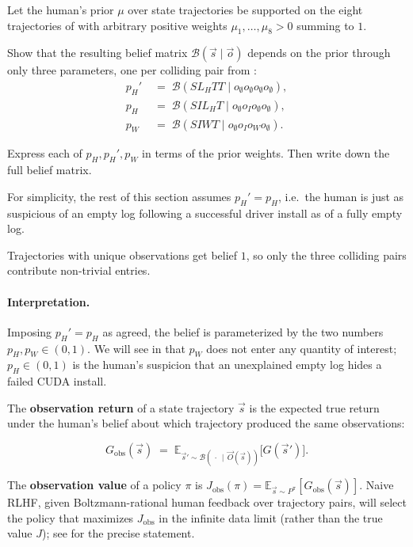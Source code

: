 \documentclass[11pt]{article}
\newcommand{\cB}{\mathcal{B}}
\newcommand{\E}{\mathbb{E}}
\newcommand{\Gobs}{G_{\mathrm{obs}}}
\newcommand{\Jobs}{J_{\mathrm{obs}}}
\begin{document}

\begin{exercise}
\label{prob:belief}
Let the human's prior $\mu$ over
state trajectories be supported on the eight trajectories of
 with arbitrary positive weights
$\mu_1, \dots, \mu_8 > 0$ summing to $1$.

Show that the resulting belief matrix
$\cB(\vec s \mid \vec o)$ depends on the prior through only three
parameters, one per colliding pair from :
\begin{align*}
p_H' &\;=\; \cB(SL_HTT \mid o_\emptyset o_\emptyset o_\emptyset o_\emptyset), \\
p_H  &\;=\; \cB(SIL_HT \mid o_\emptyset o_I o_\emptyset o_\emptyset), \\
p_W  &\;=\; \cB(SIWT \mid o_\emptyset o_I o_W o_\emptyset).
\end{align*}

Express each of $p_H, p_H', p_W$ in terms of the prior weights. Then
write down the full belief matrix.

For simplicity, the rest of this section assumes $p_H' = p_H$, i.e.\ the
human is just as suspicious of an empty log following a successful driver
install as of a fully empty log.
\end{exercise}

\begin{hint}
Trajectories with unique observations get belief $1$, so
only the three colliding pairs contribute non-trivial entries.
\end{hint}


\paragraph{Interpretation.} Imposing $p_H' = p_H$ as agreed, the belief is
parameterized by the two numbers $p_H, p_W \in (0,1)$. We will see in
 that $p_W$ does not enter any quantity of interest;
$p_H \in (0,1)$ is the human's suspicion that an unexplained empty log
hides a failed CUDA install.


\begin{definition}\label{def:Gobs}
The \textbf{observation return} of a state trajectory $\vec s$ is the
expected true return under the human's belief about which trajectory
produced the same observations:
\begin{callout}
$$
\Gobs(\vec s) \;=\; \E_{\vec s' \sim \cB(\,\cdot\,\mid\, \vec O(\vec s))}\!\bigl[G(\vec s')\bigr].
$$
\end{callout}
The \textbf{observation value} of a policy $\pi$ is
$\Jobs(\pi) = \E_{\vec s \sim P^\pi}[\Gobs(\vec s)]$. Naive RLHF, given
Boltzmann-rational human feedback over trajectory pairs, will
select the policy that maximizes $\Jobs$ in the infinite data limit
(rather than the true value $J$); see \citet[Proposition 4.1]{Lang2024PORLHF}
for the precise statement.
\end{definition}
\end{document}
